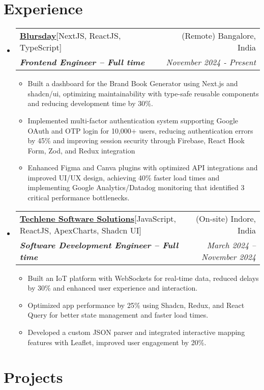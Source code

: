 \documentclass[letterpaper,10pt]{article}
\makeatletter
\newcommand{\resumeItem}[1]{
    \item\small{
      {#1 \vspace{-2pt}}
    }
  }
\newcommand{\resumeSubheading}[4]{
    \vspace{-2pt}\item
      \begin{tabular*}{0.97\textwidth}[t]{l@{\extracolsep{\fill}}r}
        {#1} & #2 \\
        \textit{\small#3} & \textit{\small #4}\\
      \end{tabular*}\vspace{-7pt}
  }
\newcommand{\resumeSubHeadingListStart}{\begin{itemize}[leftmargin=0.15in, label={}]}
\newcommand{\resumeSubHeadingListEnd}{\end{itemize}}
\newcommand{\resumeItemListStart}{\begin{itemize}}
\newcommand{\resumeItemListEnd}{\end{itemize}\vspace{-5pt}}
\makeatother
\begin{document}

\section{Experience}

\resumeSubHeadingListStart
\resumeSubheading
{\textbf{\href{https://www.blursday.ai/}{Blursday}\hspace{5pt}}{{[NextJS, ReactJS, TypeScript]}}}{(Remote) Bangalore, India}
{\textbf{Frontend Engineer – Full time}}{November 2024 - Present }
\resumeItemListStart
\resumeItem{Built a dashboard for the Brand Book Generator using Next.js and shadcn/ui, optimizing maintainability with type-safe reusable components and reducing development time by 30\%.
}
\resumeItem{Implemented multi-factor authentication system supporting Google OAuth and OTP login for 10,000+ users, reducing authentication errors by 45\% and improving session security through Firebase, React Hook Form, Zod, and Redux integration
}
\resumeItem{Enhanced Figma and Canva plugins with optimized API integrations and improved UI/UX design, achieving 40\% faster load times and implementing Google Analytics/Datadog monitoring that identified 3 critical performance bottlenecks.}
\resumeItemListEnd
\resumeSubHeadingListEnd


\resumeSubHeadingListStart
\resumeSubheading
  {\textbf{\href{https://www.techlene.com/}{Techlene Software Solutions}\hspace{5pt}}{[JavaScript, ReactJS, ApexCharts, Shadcn UI]}}{(On-site) Indore, India}
  {\textbf{Software Development Engineer – Full time}}{March 2024 -- November 2024}
  \resumeItemListStart
    \resumeItem{Built an IoT platform with WebSockets for real-time data, reduced delays by 30\% and enhanced user experience and interaction.}
    \resumeItem{Optimized app performance by 25\% using Shadcn, Redux, and React Query for better state management and faster load times.}
    \resumeItem{Developed a custom JSON parser and integrated interactive mapping features with Leaflet, improved user engagement by 20\%.}
  \resumeItemListEnd
\resumeSubHeadingListEnd





\section{Projects}
\end{document}
